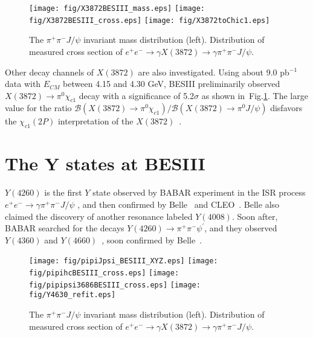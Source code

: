 \documentclass{jps-cp}
\begin{document}
\begin{figure}[tbh]
\centering
\texttt{[image: fig/X3872BESIII\_mass.eps]}
\texttt{[image: fig/X3872BESIII\_cross.eps]}
\texttt{[image: fig/X3872toChic1.eps]}
\caption{The $\pi^{+}\pi^{-}J/\psi$ invariant mass distribution (left). Distribution of measured cross section of $e^{+}e^{-} \rightarrow \gamma X(3872) \rightarrow \gamma \pi^{+}\pi^{-}J/\psi$.}
\label{X3872}
\end{figure}

 Other decay channels of $X(3872)$ are also investigated. Using about 9.0 pb$^{-1}$ data with $E_{CM}$  between 4.15 and 4.30 GeV, BESIII preliminarily observed $X(3872)\rightarrow \pi^{0} \chi_{c1}$ decay with a significance of 5.2$\sigma$ as shown in~Fig.\ref{X3872}. The large value for the ratio $\mathcal{B}(X(3872)\rightarrow \pi^{0} \chi_{c1}) / \mathcal{B}(X(3872)\rightarrow \pi^{0} J/\psi) $  disfavors the $\chi_{c1}(2P)$ interpretation of the $X(3872)$~\cite{X3872aschicJ2P}.

\section{The Y states at BESIII}
$Y(4260)$ is the first $Y$ state observed by BABAR experiment in the ISR process $e^{+}e^{-} \rightarrow \gamma \pi^{+}\pi^{-} J/\psi$ \cite{Y4260BABAR}, and then confirmed by Belle~\cite{Y4260Belle} and CLEO~\cite{Y4260CLEO}. Belle also claimed the discovery of another resonance labeled $Y(4008)$. Soon after, BABAR searched for the decays $Y(4260)\rightarrow\pi^{+}\pi^{-}\psi^{'}$, and they observed $Y(4360)$ and $Y(4660)$~\cite{Y4360BABAR}, soon confirmed by Belle~\cite{Y4360Belle}.


\begin{figure}[tbh]
\centering
\texttt{[image: fig/pipiJpsi\_BESIII\_XYZ.eps]}
\texttt{[image: fig/pipihcBESIII\_cross.eps]}
\texttt{[image: fig/pipipsi3686BESIII\_cross.eps]}
\texttt{[image: fig/Y4630\_refit.eps]}
\caption{The $\pi^{+}\pi^{-}J/\psi$ invariant mass distribution (left). Distribution of measured cross section of $e^{+}e^{-} \rightarrow \gamma X(3872) \rightarrow \gamma \pi^{+}\pi^{-}J/\psi$.}
\label{Ystates}
\end{figure}
\end{document}
